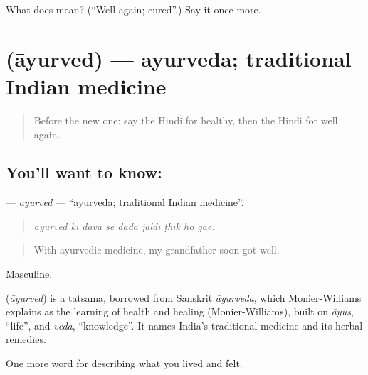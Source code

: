 \begin{tcolorbox}[breakable,colback=teal!4,colframe=teal!35!black,title={Before you move on}]
What does  mean? (\textquotedblleft{}Well again; cured\textquotedblright{}.) Say it once more.
\end{tcolorbox}
\section[\texorpdfstring{\hi{आयुर्वेद} (āyurved)}{आयुर्वेद (āyurved)}]{ (āyurved) — ayurveda; traditional Indian medicine}

\label{lesson:HI-C492-ayurved}



\begin{quote}
Before the new one: say the Hindi for healthy, then the Hindi for well again.
\end{quote}

\subsection*{You'll want to know: }
\textbf{} — \emph{āyurved} — \textquotedblleft{}ayurveda; traditional Indian medicine\textquotedblright{}.

\begin{quote}
        
\end{quote}

\begin{quote}
\emph{āyurved kī davā se dādā jaldī ṭhīk ho gae.}
\end{quote}

\begin{quote}
With ayurvedic medicine, my grandfather soon got well.
\end{quote}

Masculine.

\begin{cousinweb}
\textbf{} (\emph{āyurved}) is a tatsama, borrowed from Sanskrit \emph{āyurveda}, which Monier-Williams explains as the learning of health and healing (Monier-Williams), built on \emph{āyus}, \textquotedblleft{}life\textquotedblright{}, and \emph{veda}, \textquotedblleft{}knowledge\textquotedblright{}. It names India's traditional medicine and its herbal remedies.
\end{cousinweb}

\begin{grammarlens}[title={What you've built}]
One more word for describing what you lived and felt.
\end{grammarlens}

